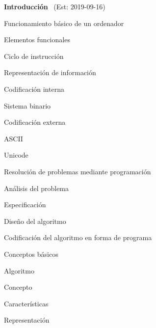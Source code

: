 \begin{longenum}
    \item \textbf{Introducción} \ (Est: 2019-09-16)
    \begin{longenum}
        \item Funcionamiento básico de un ordenador
        \begin{longenum}
            \item Elementos funcionales
            \item Ciclo de instrucción
            \item Representación de información
            \begin{longenum}
                \item Codificación interna
                \begin{longenum}
                    \item Sistema binario
                \end{longenum}
                \item Codificación externa
                \begin{longenum}
                    \item ASCII
                    \item Unicode
                \end{longenum}
            \end{longenum}
        \end{longenum}
        \item Resolución de problemas mediante programación
        \begin{longenum}
            \item Análisis del problema
            \item Especificación
            \item Diseño del algoritmo
            \item Codificación del algoritmo en forma de programa
        \end{longenum}
        \item Conceptos básicos
        \begin{longenum}
            \item Algoritmo
            \begin{longenum}
                \item Concepto
                \item Características
                \item Representación
                \begin{longenum}

\end{longenum}
\end{longenum}
\end{longenum}
\end{longenum}
\end{longenum}
